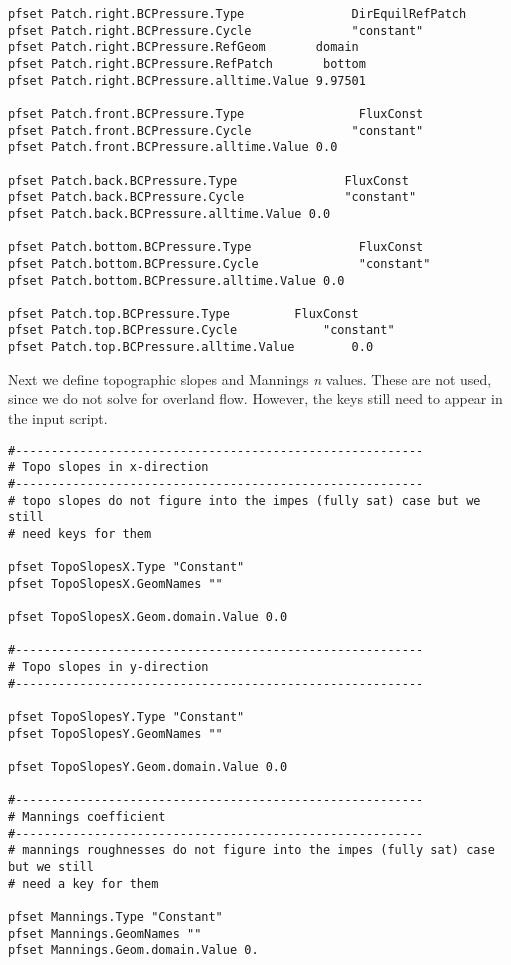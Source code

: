 \begin{verbatim}
pfset Patch.right.BCPressure.Type               DirEquilRefPatch
pfset Patch.right.BCPressure.Cycle              "constant"
pfset Patch.right.BCPressure.RefGeom       domain
pfset Patch.right.BCPressure.RefPatch       bottom
pfset Patch.right.BCPressure.alltime.Value 9.97501

pfset Patch.front.BCPressure.Type                FluxConst
pfset Patch.front.BCPressure.Cycle              "constant"
pfset Patch.front.BCPressure.alltime.Value 0.0

pfset Patch.back.BCPressure.Type               FluxConst
pfset Patch.back.BCPressure.Cycle              "constant"
pfset Patch.back.BCPressure.alltime.Value 0.0

pfset Patch.bottom.BCPressure.Type               FluxConst
pfset Patch.bottom.BCPressure.Cycle              "constant"
pfset Patch.bottom.BCPressure.alltime.Value 0.0

pfset Patch.top.BCPressure.Type			FluxConst
pfset Patch.top.BCPressure.Cycle			"constant"
pfset Patch.top.BCPressure.alltime.Value		0.0
\end{verbatim}

Next we define topographic slopes and Mannings \emph{n} values. 
These are not used, since we do not solve for overland flow.  
However, the keys still need to appear in the input script.

\begin{verbatim}
#---------------------------------------------------------
# Topo slopes in x-direction
#---------------------------------------------------------
# topo slopes do not figure into the impes (fully sat) case but we still
# need keys for them

pfset TopoSlopesX.Type "Constant"
pfset TopoSlopesX.GeomNames ""

pfset TopoSlopesX.Geom.domain.Value 0.0

#---------------------------------------------------------
# Topo slopes in y-direction
#---------------------------------------------------------

pfset TopoSlopesY.Type "Constant"
pfset TopoSlopesY.GeomNames ""

pfset TopoSlopesY.Geom.domain.Value 0.0

#---------------------------------------------------------
# Mannings coefficient 
#---------------------------------------------------------
# mannings roughnesses do not figure into the impes (fully sat) case but we still
# need a key for them

pfset Mannings.Type "Constant"
pfset Mannings.GeomNames ""
pfset Mannings.Geom.domain.Value 0.
\end{verbatim}

